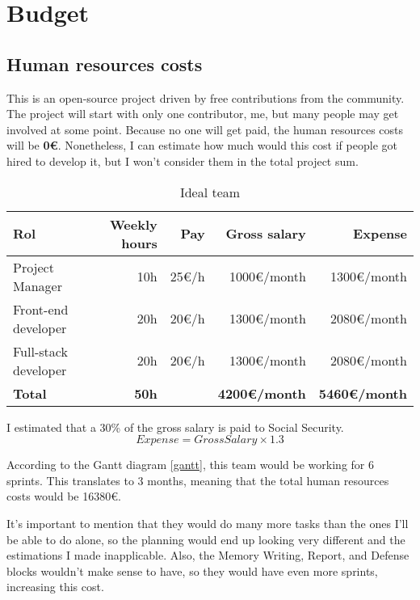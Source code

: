 \section{Budget}
\label{sec:budget}

\subsection{Human resources costs}
This is an open-source project driven by free contributions from the community. The project will start with only one contributor, me, but many people may get involved at some point. Because no one will get paid, the human resources costs will be \textbf{0€}. Nonetheless, I can estimate how much would this cost if people got hired to develop it, but I won't consider them in the total project sum.

\begin{table}[h!]
\centering
\begin{tabular}{lrrrr}
    \toprule
    \textbf{Rol} & \textbf{Weekly hours} & \textbf{Pay} & \textbf{Gross salary} & \textbf{Expense} \\
    \midrule
    Project Manager & 10h & 25€/h & 1000€/month & 1300€/month \\
    Front-end developer & 20h & 20€/h & 1300€/month & 2080€/month \\
    Full-stack developer & 20h & 20€/h & 1300€/month & 2080€/month \\
    \midrule
    \textbf{Total} & \textbf{50h} & & \textbf{4200€/month} & \textbf{5460€/month} \\
    \bottomrule
\end{tabular}
\caption{Ideal team}
\label{ideal-team}
\end{table}
I estimated that a 30\% of the gross salary is paid to Social Security.
\[Expense=GrossSalary\times1.3\]

According to the Gantt diagram \ref{gantt}, this team would be working for 6 sprints. This translates to 3 months, meaning that the total human resources costs would be 16380€. 

It's important to mention that they would do many more tasks than the ones I'll be able to do alone, so the planning would end up looking very different and the estimations I made inapplicable. Also, the Memory Writing, Report, and Defense blocks wouldn't make sense to have, so they would have even more sprints, increasing this cost.


